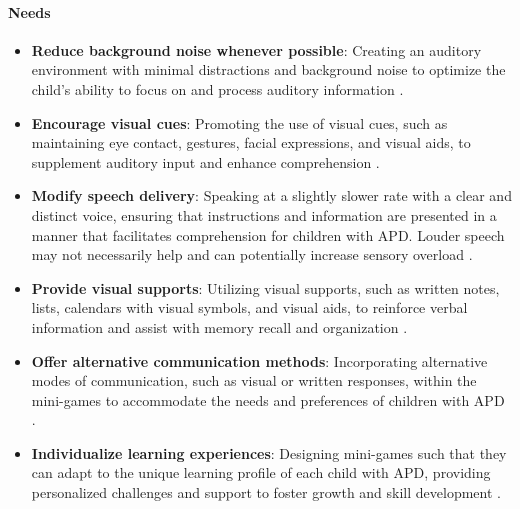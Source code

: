 \paragraph{Needs}
\begin{itemize}
    \item \textbf{Reduce background noise whenever possible}: Creating an auditory environment with minimal distractions and background noise to optimize the child's ability to focus on and process auditory information \cite{Nationwide}.
    \item \textbf{Encourage visual cues}: Promoting the use of visual cues, such as maintaining eye contact, gestures, facial expressions, and visual aids, to supplement auditory input and enhance comprehension \cite{Nationwide}.
    \item \textbf{Modify speech delivery}: Speaking at a slightly slower rate with a clear and distinct voice, ensuring that instructions and information are presented in a manner that facilitates comprehension for children with APD. Louder speech may not necessarily help and can potentially increase sensory overload \cite{KidsHealth}.
    \item \textbf{Provide visual supports}: Utilizing visual supports, such as written notes, lists, calendars with visual symbols, and visual aids, to reinforce verbal information and assist with memory recall and organization \cite{KidsHealth}.
    \item \textbf{Offer alternative communication methods}: Incorporating alternative modes of communication, such as visual or written responses, within the mini-games to accommodate the needs and preferences of children with APD \cite{KidsHealth}.
    \item \textbf{Individualize learning experiences}: Designing mini-games such that they can adapt to the unique learning profile of each child with APD, providing personalized challenges and support to foster growth and skill development \cite{KidsHealth}.
\end{itemize}

